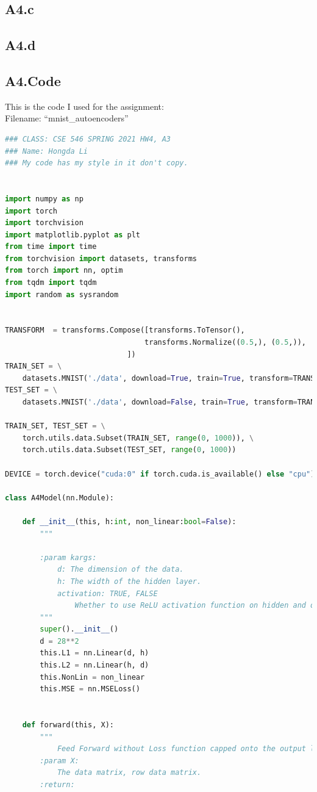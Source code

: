 \documentclass[]{article}
\begin{document}
    \subsection*{A4.c}
    \subsection*{A4.d}
    \subsection*{A4.Code}\label{A4.Code}
    This is the code I used for the assignment: 
    \\
    Filename: ``mnist\_autoencoders''
        \begin{lstlisting}[language=python]
### CLASS: CSE 546 SPRING 2021 HW4, A3
### Name: Hongda Li
### My code has my style in it don't copy.


import numpy as np
import torch
import torchvision
import matplotlib.pyplot as plt
from time import time
from torchvision import datasets, transforms
from torch import nn, optim
from tqdm import tqdm
import random as sysrandom


TRANSFORM  = transforms.Compose([transforms.ToTensor(),
                                transforms.Normalize((0.5,), (0.5,)),
                            ])
TRAIN_SET = \
    datasets.MNIST('./data', download=True, train=True, transform=TRANSFORM)
TEST_SET = \
    datasets.MNIST('./data', download=False, train=True, transform=TRANSFORM)

TRAIN_SET, TEST_SET = \
    torch.utils.data.Subset(TRAIN_SET, range(0, 1000)), \
    torch.utils.data.Subset(TEST_SET, range(0, 1000))

DEVICE = torch.device("cuda:0" if torch.cuda.is_available() else "cpu")

class A4Model(nn.Module):

    def __init__(this, h:int, non_linear:bool=False):
        """

        :param kargs:
            d: The dimension of the data.
            h: The width of the hidden layer.
            activation: TRUE, FALSE
                Whether to use ReLU activation function on hidden and output layer.
        """
        super().__init__()
        d = 28**2
        this.L1 = nn.Linear(d, h)
        this.L2 = nn.Linear(h, d)
        this.NonLin = non_linear
        this.MSE = nn.MSELoss()


    def forward(this, X):
        """
            Feed Forward without Loss function capped onto the output layer.
        :param X:
            The data matrix, row data matrix.
        :return:


\end{lstlisting}
\end{document}

